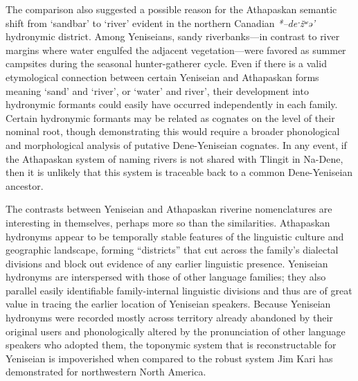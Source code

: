 The comparison also suggested a possible reason for the Athapaskan semantic shift from ‘sandbar’ to ‘river’ evident in the northern Canadian \textit{*–deˑžʷə’} hydronymic district. Among Yeniseians, sandy riverbanks---in contrast to river margins where water engulfed the adjacent vegetation---were favored as summer campsites during the seasonal hunter-gatherer cycle. Even if there is a valid etymological connection between certain Yeniseian and Athapaskan forms meaning ‘sand’ and ‘river’, or ‘water’ and river’, their development into hydronymic formants could easily have occurred independently in each family. Certain hydronymic formants may be related as cognates on the level of their nominal root, though demonstrating this would require a broader phonological and morphological analysis of putative Dene-Yeniseian cognates. In any event, if the Athapaskan system of naming rivers is not shared with Tlingit in Na-Dene, then it is unlikely that this system is traceable back to a common Dene-Yeniseian ancestor.

The contrasts between Yeniseian and Athapaskan riverine nomenclatures are interesting in themselves, perhaps more so than the similarities. Athapaskan hydronyms appear to be temporally stable features of the linguistic culture and geographic landscape, forming “districts” that cut across the family’s dialectal divisions and block out evidence of any earlier linguistic presence. Yeniseian hydronyms are interspersed with those of other language families; they also parallel easily identifiable family-internal linguistic divisions and thus are of great value in tracing the earlier location of Yeniseian speakers. Because Yeniseian hydronyms were recorded mostly across territory already abandoned by their original users and phonologically altered by the pronunciation of other language speakers who adopted them, the toponymic system that is reconstructable for Yeniseian is impoverished when compared to the robust system Jim Kari has demonstrated for northwestern North America.



